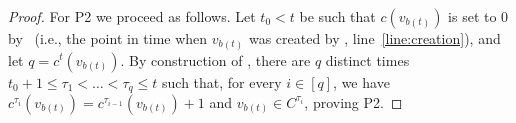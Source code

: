 \begin{proof}
For P2 we proceed as follows. Let $t_0 < t$ be such that $c(v_{b(t)})$ is set to $0$ by \AlgoBuild\ (i.e., the point in time when $v_{b(t)}$ was created by \AlgoBuild, line~\ref{line:creation}), and let $q=c^t(v_{b(t)})$. By construction of \AlgoUpdate, there are $q$ distinct times $t_0 +1 \le \tau_1 < \dots < \tau_q \leq t$ such that, for every $i \in [q]$, we have $c^{\tau_{i}}(v_{b(t)}) = c^{\tau_{i-1}}(v_{b(t)})+1$ and $v_{b(t)} \in C^{\tau_i}$, proving P2.

%
%
%
%


\end{proof}
